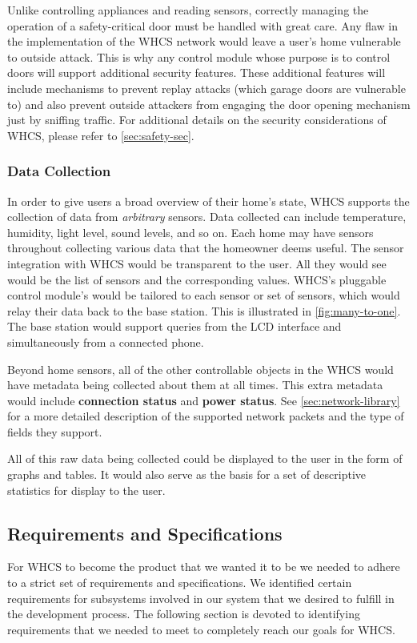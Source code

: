 Unlike controlling appliances and reading sensors, correctly managing the
operation of a safety-critical door must be handled with great care. Any flaw
in the implementation of the WHCS network would leave a user's home vulnerable
to outside attack. This is why any control module whose purpose is to control
doors will support additional security features. These additional features will
include mechanisms to prevent replay attacks (which garage doors are vulnerable
to) and also prevent outside attackers from engaging the door opening mechanism
just by sniffing traffic. For additional details on the security considerations
of WHCS, please refer to \autoref{sec:safety-sec}.

\subsubsection{Data Collection}
In order to give users a broad overview of their home's state, WHCS supports
the collection of data from \emph{arbitrary} sensors. Data collected can
include temperature, humidity, light level, sound levels, and so on. Each home
may have sensors throughout collecting various data that the homeowner deems
useful. The sensor integration with WHCS would be transparent to the user. All
they would see would be the list of sensors and the corresponding values.
WHCS's pluggable control module's would be tailored to each sensor or set of
sensors, which would relay their data back to the base station. This is
illustrated in \autoref{fig:many-to-one}. The base station would support
queries from the LCD interface and simultaneously from a connected phone.


Beyond home sensors, all of the other controllable objects in the WHCS
would have metadata being collected about them at all times. This extra metadata
would include \textbf{connection status} and \textbf{power status}. See
\autoref{sec:network-library} for a more detailed description of the supported
network packets and the type of fields they support.

All of this raw data being collected could be displayed to the user in the form
of graphs and tables. It would also serve as the basis for a set of descriptive
statistics for display to the user.

\subsection{Requirements and Specifications}
For WHCS to become the product that we wanted it to be we needed to adhere to a strict
set of requirements and specifications.  We identified certain
requirements for subsystems involved in our system that we desired to fulfill in the
development process. The following section is devoted to identifying
requirements that we needed to meet to completely reach our goals for WHCS.

